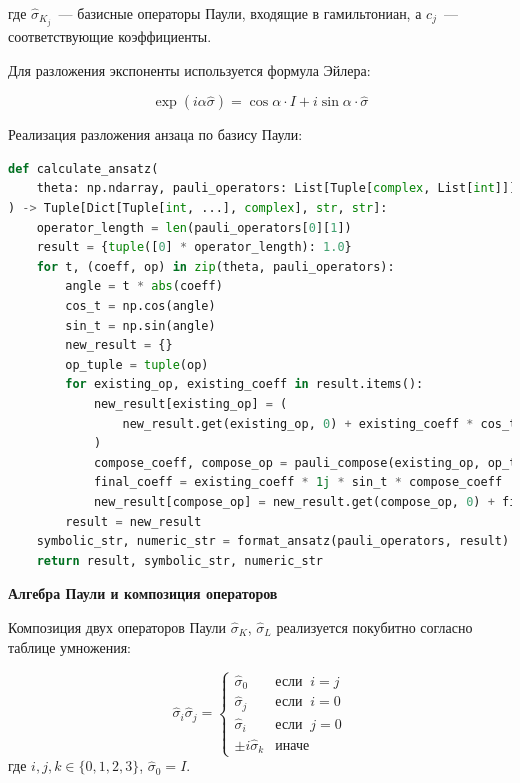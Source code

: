\documentclass[a4paper]{report}
\begin{document}
где $\hat{\sigma}_{K_j}$~--- базисные операторы Паули, входящие в гамильтониан, а $c_j$~--- соответствующие коэффициенты.

Для разложения экспоненты используется формула Эйлера:

\begin{equation}
    \exp(i\alpha \hat{\sigma}) = \cos\alpha \cdot I + i\sin\alpha \cdot \hat{\sigma}
\end{equation}

Реализация разложения анзаца по базису Паули:

\begin{lstlisting}[language=Python]
def calculate_ansatz(
    theta: np.ndarray, pauli_operators: List[Tuple[complex, List[int]]]
) -> Tuple[Dict[Tuple[int, ...], complex], str, str]:
    operator_length = len(pauli_operators[0][1])
    result = {tuple([0] * operator_length): 1.0}
    for t, (coeff, op) in zip(theta, pauli_operators):
        angle = t * abs(coeff)
        cos_t = np.cos(angle)
        sin_t = np.sin(angle)
        new_result = {}
        op_tuple = tuple(op)
        for existing_op, existing_coeff in result.items():
            new_result[existing_op] = (
                new_result.get(existing_op, 0) + existing_coeff * cos_t
            )
            compose_coeff, compose_op = pauli_compose(existing_op, op_tuple)
            final_coeff = existing_coeff * 1j * sin_t * compose_coeff
            new_result[compose_op] = new_result.get(compose_op, 0) + final_coeff
        result = new_result
    symbolic_str, numeric_str = format_ansatz(pauli_operators, result)
    return result, symbolic_str, numeric_str
\end{lstlisting}

\noindent
\textbf{Алгебра Паули и композиция операторов}

Композиция двух операторов Паули $\hat{\sigma}_K$, $\hat{\sigma}_L$ реализуется покубитно согласно таблице умножения:

\begin{equation}
    \hat{\sigma}_i \hat{\sigma}_j =
    \begin{cases}
        \hat{\sigma}_0 & \text{если}\;\; i = j \\
        \hat{\sigma}_j & \text{если}\;\; i = 0 \\
        \hat{\sigma}_i & \text{если}\;\; j = 0 \\
        \pm i\hat{\sigma}_k & \text{иначе}
    \end{cases}
\end{equation}
\noindent
где $i,j,k \in \{0,1,2,3\}$, $\hat{\sigma}_0 = I$.
\end{document}
